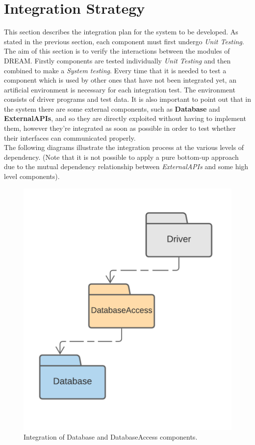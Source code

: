 \section{Integration Strategy}

This section describes the integration plan for the system to be developed. As stated in the previous section, each component must first undergo \textit{Unit Testing}.
The aim of this section is to verify the interactions between the modules of DREAM. 
Firstly components are tested individually \textit{Unit Testing} and then combined to make a \textit{System testing}.
Every time that it is needed to test a component which is used by other ones that have not been integrated yet, an artificial environment is necessary for each integration test. The environment consists of driver programs and test data.
It is also important to point out that in the system there are some external components, such as \textbf{Database} and \textbf{ExternalAPIs}, and so they are directly exploited without having to implement them, however they're integrated as soon as possible in order to test whether their interfaces can communicated properly.\\
The following diagrams illustrate the integration process at the various levels of dependency.
(Note that it is not possible to apply a pure bottom-up approach due to the mutual dependency relationship between \textit{ExternalAPIs} and some high level components).
\begin{center}
    \begin{figure}[h!]
    \centering
  \includegraphics[scale=0.25] {./Images/IntegrationStrategy/IT1.png}
  \caption{Integration of Database and DatabaseAccess components.}
\end{figure}
\end{center}



